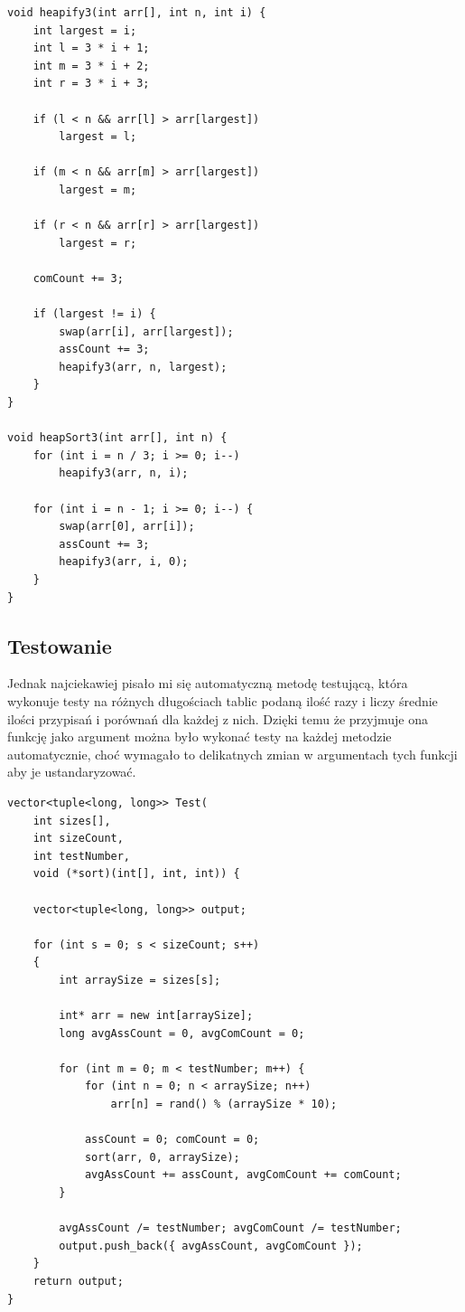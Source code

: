 \documentclass{article}
\begin{document}
\begin{verbatim}
void heapify3(int arr[], int n, int i) {
    int largest = i;
    int l = 3 * i + 1;
    int m = 3 * i + 2;
    int r = 3 * i + 3;

    if (l < n && arr[l] > arr[largest])
        largest = l;

    if (m < n && arr[m] > arr[largest])
        largest = m;

    if (r < n && arr[r] > arr[largest])
        largest = r;

    comCount += 3;

    if (largest != i) {
        swap(arr[i], arr[largest]);
        assCount += 3;
        heapify3(arr, n, largest);
    }
}

void heapSort3(int arr[], int n) {
    for (int i = n / 3; i >= 0; i--)
        heapify3(arr, n, i);

    for (int i = n - 1; i >= 0; i--) {
        swap(arr[0], arr[i]);
        assCount += 3;
        heapify3(arr, i, 0);
    }
}
\end{verbatim}

\subsection{Testowanie}

Jednak najciekawiej pisało mi się automatyczną metodę testującą, która wykonuje testy na różnych długościach tablic podaną ilość razy i liczy średnie ilości przypisań i porównań dla każdej z nich. Dzięki temu że przyjmuje ona funkcję jako argument można było wykonać testy na każdej metodzie automatycznie, choć wymagało to delikatnych zmian w argumentach tych funkcji aby je ustandaryzować. 

\begin{verbatim}
vector<tuple<long, long>> Test(
    int sizes[],
    int sizeCount, 
    int testNumber,
    void (*sort)(int[], int, int)) {
    
    vector<tuple<long, long>> output;

    for (int s = 0; s < sizeCount; s++)
    {
        int arraySize = sizes[s];

        int* arr = new int[arraySize];
        long avgAssCount = 0, avgComCount = 0;

        for (int m = 0; m < testNumber; m++) {
            for (int n = 0; n < arraySize; n++)
                arr[n] = rand() % (arraySize * 10);

            assCount = 0; comCount = 0;
            sort(arr, 0, arraySize);
            avgAssCount += assCount, avgComCount += comCount;
        }
        
        avgAssCount /= testNumber; avgComCount /= testNumber;
        output.push_back({ avgAssCount, avgComCount });
    }
    return output;
}
\end{verbatim}
\end{document}
